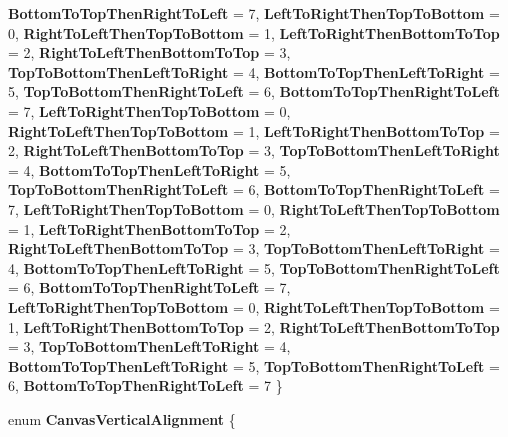 \begin{DoxyCompactItemize}
{\bfseries Bottom\+To\+Top\+Then\+Right\+To\+Left} = 7, 
\newline
{\bfseries Left\+To\+Right\+Then\+Top\+To\+Bottom} = 0, 
{\bfseries Right\+To\+Left\+Then\+Top\+To\+Bottom} = 1, 
{\bfseries Left\+To\+Right\+Then\+Bottom\+To\+Top} = 2, 
{\bfseries Right\+To\+Left\+Then\+Bottom\+To\+Top} = 3, 
\newline
{\bfseries Top\+To\+Bottom\+Then\+Left\+To\+Right} = 4, 
{\bfseries Bottom\+To\+Top\+Then\+Left\+To\+Right} = 5, 
{\bfseries Top\+To\+Bottom\+Then\+Right\+To\+Left} = 6, 
{\bfseries Bottom\+To\+Top\+Then\+Right\+To\+Left} = 7, 
\newline
{\bfseries Left\+To\+Right\+Then\+Top\+To\+Bottom} = 0, 
{\bfseries Right\+To\+Left\+Then\+Top\+To\+Bottom} = 1, 
{\bfseries Left\+To\+Right\+Then\+Bottom\+To\+Top} = 2, 
{\bfseries Right\+To\+Left\+Then\+Bottom\+To\+Top} = 3, 
\newline
{\bfseries Top\+To\+Bottom\+Then\+Left\+To\+Right} = 4, 
{\bfseries Bottom\+To\+Top\+Then\+Left\+To\+Right} = 5, 
{\bfseries Top\+To\+Bottom\+Then\+Right\+To\+Left} = 6, 
{\bfseries Bottom\+To\+Top\+Then\+Right\+To\+Left} = 7, 
\newline
{\bfseries Left\+To\+Right\+Then\+Top\+To\+Bottom} = 0, 
{\bfseries Right\+To\+Left\+Then\+Top\+To\+Bottom} = 1, 
{\bfseries Left\+To\+Right\+Then\+Bottom\+To\+Top} = 2, 
{\bfseries Right\+To\+Left\+Then\+Bottom\+To\+Top} = 3, 
\newline
{\bfseries Top\+To\+Bottom\+Then\+Left\+To\+Right} = 4, 
{\bfseries Bottom\+To\+Top\+Then\+Left\+To\+Right} = 5, 
{\bfseries Top\+To\+Bottom\+Then\+Right\+To\+Left} = 6, 
{\bfseries Bottom\+To\+Top\+Then\+Right\+To\+Left} = 7, 
\newline
{\bfseries Left\+To\+Right\+Then\+Top\+To\+Bottom} = 0, 
{\bfseries Right\+To\+Left\+Then\+Top\+To\+Bottom} = 1, 
{\bfseries Left\+To\+Right\+Then\+Bottom\+To\+Top} = 2, 
{\bfseries Right\+To\+Left\+Then\+Bottom\+To\+Top} = 3, 
\newline
{\bfseries Top\+To\+Bottom\+Then\+Left\+To\+Right} = 4, 
{\bfseries Bottom\+To\+Top\+Then\+Left\+To\+Right} = 5, 
{\bfseries Top\+To\+Bottom\+Then\+Right\+To\+Left} = 6, 
{\bfseries Bottom\+To\+Top\+Then\+Right\+To\+Left} = 7
 \}
\item 
\mbox{\label{namespace_microsoft_1_1_graphics_1_1_canvas_1_1_text_a152840fdbab49a06690e74695359e3fd}} 
enum {\bfseries Canvas\+Vertical\+Alignment} \{ \newline

\end{DoxyCompactItemize}
